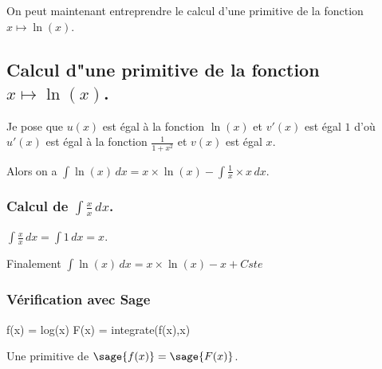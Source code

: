 \documentclass[a4paper,14pt]{extreport} %
\begin{document}
On peut maintenant entreprendre le calcul d'une primitive de la  fonction  $x \mapsto \ln(x) $.






\subsection{Calcul d"une primitive de la fonction  $x \mapsto \ln(x) $.}


Je pose que $u(x)$  est égal à la fonction $\ln(x)$ et $v'(x)$ est égal $1$  d'où $u'(x)$  est égal à la fonction $ \frac{1}{1+ x^2} $ et $v(x)$ est égal $x$.

Alors on a $\int \ln(x) \, dx = x \times \ln(x) -\int \frac{1}{x} \times x \, dx $.


\subsubsection{Calcul de $\int \frac{x}{x} \, dx $.}

$\int \frac{x}{x} \, dx = \int 1 \, dx = x$.


Finalement $\int \ln(x) \, dx = x \times \ln(x) -x + Cste $

\subsubsection{Vérification avec Sage}

\begin{sageblock}
    f(x) = log(x)
    F(x) = integrate(f(x),x)
\end{sageblock}

Une primitive de $\sage{f(x)} = \sage{F(x)} $.
\end{document}
